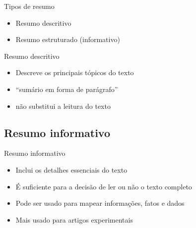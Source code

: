 \documentclass{beamer}
\begin{document}
\begin{frame}{Tipos de resumo}
  \begin{itemize}
  \item Resumo descritivo
  \item Resumo estruturado (informativo)
  \end{itemize}
\end{frame}

\begin{frame}{Resumo descritivo}
  \begin{itemize}
  \item Descreve os principais tópicos do texto
  \item ``sumário em forma de parágrafo''
  \item não substitui a leitura do texto
  \end{itemize}
\end{frame}



\subsection{Resumo informativo}

\begin{frame}{Resumo informativo}
  \begin{itemize}
  \item Inclui os detalhes essenciais do texto
  \item É suficiente para a decisão de ler ou não o texto completo
  \item Pode ser usado para mapear informações, fatos e dados
  \item Mais usado para artigos experimentais
  \end{itemize}
\end{frame}
\end{document}
